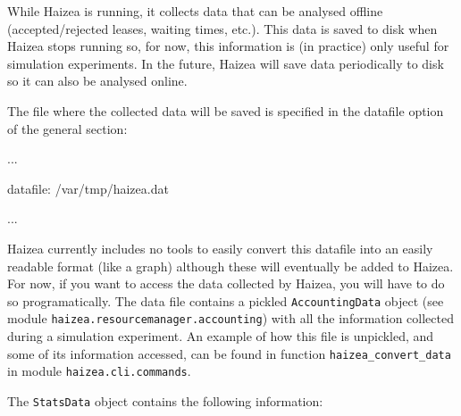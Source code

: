 While Haizea is running, it collects data that can be analysed offline (accepted/rejected leases, waiting times, etc.). This data is saved to disk when Haizea stops running so, for now, this information is (in practice) only useful for simulation experiments. In the future, Haizea will save data periodically to disk so it can also be analysed online.

The file where the collected data will be saved is specified in the datafile option of the general section:

\begin{wideshellverbatim}
[general]
...

datafile: /var/tmp/haizea.dat

...
\end{wideshellverbatim}

Haizea currently includes no tools to easily convert this datafile into an easily readable format (like a graph) although these will eventually be added to Haizea. For now, if you want to access the data collected by Haizea, you will have to do so programatically. The data file contains a pickled \texttt{AccountingData} object (see module \texttt{haizea.resourcemanager.accounting}) with all the information collected during a simulation experiment. An example of how this file is unpickled, and some of its information accessed, can be found in function \texttt{haizea\_convert\_data} in module \texttt{haizea.cli.commands}.

The \texttt{StatsData} object contains the following information:

